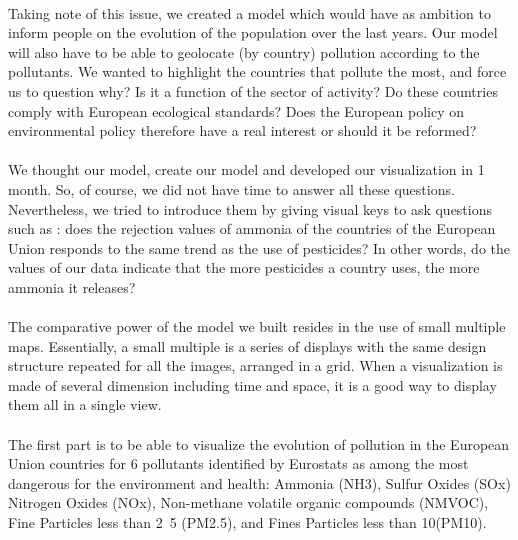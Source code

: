 \documentclass[preprint,journal]{vgtc}       %
\begin{document}
\paragraph{}
Taking note of this issue, we created a model which would have as ambition to inform people on the evolution of the population over the last years. Our model will also have to be able to geolocate (by country) pollution according to the pollutants.
We wanted to highlight the countries that pollute the most, and force us to question why? Is it a function of the sector of activity? Do these countries comply with European ecological standards? Does the European policy on environmental policy therefore have a real interest or should it be reformed?

\paragraph{}
We thought our model, create our model and developed our visualization in 1 month. So, of course, we did not have time to answer all these questions. Nevertheless, we tried to introduce them by giving visual keys to ask questions such as : does the rejection values ​​of ammonia of the countries of the European Union responds to the same trend as the use of pesticides? In other words, do the values ​​of our data indicate that the more pesticides a country uses, the more ammonia it releases?

\paragraph{}
The comparative power of the model we built resides in the use of small multiple maps. Essentially, a small multiple is a series of displays with the same design structure repeated for all the images, arranged in a grid. When a visualization is made of several dimension including time and space, it is a good way to display them all in a single view.

\paragraph{}
The first part is to be able to visualize the evolution of pollution in the European Union countries for 6 pollutants identified by Eurostats as among the most dangerous for the environment and health: Ammonia (NH3), Sulfur Oxides (SOx) Nitrogen Oxides (NOx), Non-methane volatile organic compounds (NMVOC), Fine Particles less than \unit{2.5}{\micro\meter} (PM2.5), and Fines Particles less than \unit{10}{\micro\meter}(PM10).
\end{document}
